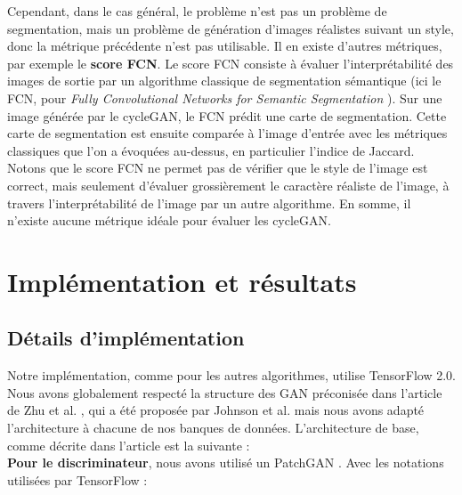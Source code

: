 Cependant, dans le cas général, le problème n'est pas un problème de segmentation, mais un problème de génération d'images réalistes suivant un style, donc la métrique précédente n'est pas utilisable. Il en existe d'autres métriques, par exemple le \textbf{score FCN}. Le score FCN consiste à évaluer l'interprétabilité des images de sortie par un algorithme classique de segmentation sémantique (ici le FCN, pour \textit{Fully Convolutional Networks for Semantic Segmentation} \cite{long_fully_2014}). Sur une image générée par le cycleGAN, le FCN prédit une carte de segmentation. Cette carte de segmentation est ensuite comparée à l’image d’entrée avec les métriques classiques que l'on a évoquées au-dessus, en particulier l'indice de Jaccard.\\
Notons que le score FCN ne permet pas de vérifier que le style de l'image est correct, mais seulement d'évaluer grossièrement le caractère réaliste de l'image, à travers l'interprétabilité de l'image par un autre algorithme. En somme, il n'existe aucune métrique idéale pour évaluer les cycleGAN.


\section{Implémentation et résultats}

\subsection{Détails d'implémentation}

Notre implémentation, comme pour les autres algorithmes, utilise TensorFlow 2.0. Nous avons globalement respecté la structure des GAN préconisée dans l'article de Zhu et al. \cite{zhu_unpaired_2018}, qui a été proposée par Johnson  et  al. \cite{johnson_perceptual_2016} mais nous avons adapté l'architecture à chacune de nos banques de données. L'architecture de base, comme décrite dans l'article est la suivante : \\

\textbf{Pour le discriminateur}, nous avons utilisé un PatchGAN \cite{isola_image--image_2018-3}. Avec les notations utilisées par TensorFlow :


